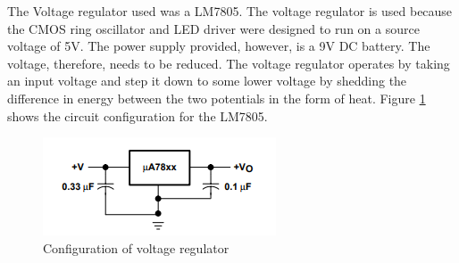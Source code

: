 
	
The Voltage regulator used was a LM7805. The voltage regulator is used because the CMOS ring oscillator and LED driver were designed to run on a source voltage of 5V. The power supply provided, however, is a 9V DC battery. The voltage, therefore, needs to be reduced. The voltage regulator operates by taking an input voltage and step it down to some lower voltage by shedding the difference in energy between the two potentials in the form of heat. Figure \ref{fig:voltageregulator} shows the circuit configuration for the LM7805.

\begin{figure}
	\centering
	\includegraphics[width=0.7\linewidth]{CircuitDevelopment/voltageregulator}
	\caption[Voltage regulator]{Configuration of voltage regulator\cite{b3}}
	\label{fig:voltageregulator}
\end{figure}

	
	
	
	
	
